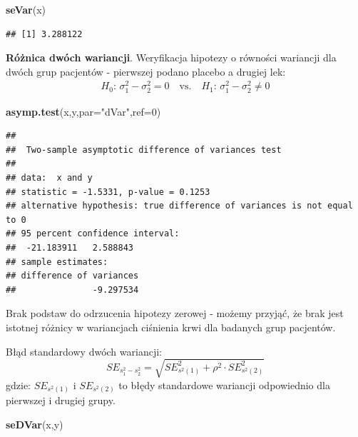 \documentclass[polish,]{book}
\newenvironment{Shaded}{\begin{snugshade}}{\end{snugshade}}
\newcommand{\DataTypeTok}[1]{\textcolor[rgb]{0.13,0.29,0.53}{#1}}
\newcommand{\DecValTok}[1]{\textcolor[rgb]{0.00,0.00,0.81}{#1}}
\newcommand{\KeywordTok}[1]{\textcolor[rgb]{0.13,0.29,0.53}{\textbf{#1}}}
\newcommand{\NormalTok}[1]{#1}
\newcommand{\StringTok}[1]{\textcolor[rgb]{0.31,0.60,0.02}{#1}}
\begin{document}
\begin{Shaded}
\begin{Highlighting}[]
\KeywordTok{seVar}\NormalTok{(x)}
\end{Highlighting}
\end{Shaded}

\begin{verbatim}
## [1] 3.288122
\end{verbatim}

\textbf{Różnica dwóch wariancji}. Weryfikacja hipotezy o równości wariancji dla dwóch grup pacjentów - pierwszej podano placebo a drugiej lek:
\[
\begin{array}{ll}
H_0:\,\sigma^2_1-\sigma^2_2 = 0\quad\mbox{vs.}\quad H_1:\,\sigma^2_1-\sigma^2_2 \neq 0
\end{array}
\]

\begin{Shaded}
\begin{Highlighting}[]
\KeywordTok{asymp.test}\NormalTok{(x,y,}\DataTypeTok{par=}\StringTok{"dVar"}\NormalTok{,}\DataTypeTok{ref=}\DecValTok{0}\NormalTok{)}
\end{Highlighting}
\end{Shaded}

\begin{verbatim}
## 
##  Two-sample asymptotic difference of variances test
## 
## data:  x and y
## statistic = -1.5331, p-value = 0.1253
## alternative hypothesis: true difference of variances is not equal to 0
## 95 percent confidence interval:
##  -21.183911   2.588843
## sample estimates:
## difference of variances 
##               -9.297534
\end{verbatim}

Brak podstaw do odrzucenia hipotezy zerowej - możemy przyjąć, że brak jest istotnej różnicy w wariancjach ciśnienia krwi dla badanych grup pacjentów.

Błąd standardowy dwóch wariancji:
\begin{equation}
SE_{s_1^2-s_2^2}=\sqrt{SE_{s^2(1)}^2 +\rho^2\cdot SE_{s^2(2)}^2}
\label{eq:wz1148}
\end{equation}
gdzie: \(SE_{s^2(1)}\) i \(SE_{s^2(2)}\) to błędy standardowe wariancji odpowiednio dla pierwszej i drugiej grupy.

\begin{Shaded}
\begin{Highlighting}[]
\KeywordTok{seDVar}\NormalTok{(x,y)}
\end{Highlighting}
\end{Shaded}
\end{document}

